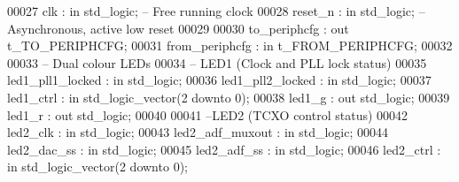 \begin{DoxyCode}
00027       \textcolor{vhdlchar}{clk}                  \textcolor{vhdlchar}{:} \textcolor{keywordflow}{in}     \textcolor{comment}{std\_logic};\textcolor{keyword}{ -- Free running clock}
00028       \textcolor{vhdlchar}{reset_n}              \textcolor{vhdlchar}{:} \textcolor{keywordflow}{in}     \textcolor{comment}{std\_logic};\textcolor{keyword}{ -- Asynchronous, active low reset}
00029       
00030       \textcolor{vhdlchar}{to_periphcfg}         \textcolor{vhdlchar}{:} \textcolor{keywordflow}{out}    \textcolor{vhdlchar}{t_TO_PERIPHCFG};
00031       \textcolor{vhdlchar}{from_periphcfg}       \textcolor{vhdlchar}{:} \textcolor{keywordflow}{in}     \textcolor{vhdlchar}{t_FROM_PERIPHCFG};
00032       
00033 \textcolor{keyword}{      -- Dual colour LEDs}
00034 \textcolor{keyword}{      -- LED1 (Clock and PLL lock status)}
00035       \textcolor{vhdlchar}{led1_pll1_locked}     \textcolor{vhdlchar}{:} \textcolor{keywordflow}{in}     \textcolor{comment}{std\_logic};
00036       \textcolor{vhdlchar}{led1_pll2_locked}     \textcolor{vhdlchar}{:} \textcolor{keywordflow}{in}     \textcolor{comment}{std\_logic};
00037       \textcolor{vhdlchar}{led1_ctrl}            \textcolor{vhdlchar}{:} \textcolor{keywordflow}{in}     \textcolor{comment}{std\_logic\_vector}\textcolor{vhdlchar}{(}\textcolor{vhdllogic}{}\textcolor{vhdllogic}{2} \textcolor{keywordflow}{downto} \textcolor{vhdllogic}{}\textcolor{vhdllogic}{0}\textcolor{vhdlchar}{)};
00038       \textcolor{vhdlchar}{led1_g}               \textcolor{vhdlchar}{:} \textcolor{keywordflow}{out}    \textcolor{comment}{std\_logic};
00039       \textcolor{vhdlchar}{led1_r}               \textcolor{vhdlchar}{:} \textcolor{keywordflow}{out}    \textcolor{comment}{std\_logic};
00040       
00041 \textcolor{keyword}{      --LED2 (TCXO control status)}
00042       \textcolor{vhdlchar}{led2_clk}             \textcolor{vhdlchar}{:} \textcolor{keywordflow}{in}     \textcolor{comment}{std\_logic};
00043       \textcolor{vhdlchar}{led2_adf_muxout}      \textcolor{vhdlchar}{:} \textcolor{keywordflow}{in}     \textcolor{comment}{std\_logic};
00044       \textcolor{vhdlchar}{led2_dac_ss}          \textcolor{vhdlchar}{:} \textcolor{keywordflow}{in}     \textcolor{comment}{std\_logic};
00045       \textcolor{vhdlchar}{led2_adf_ss}          \textcolor{vhdlchar}{:} \textcolor{keywordflow}{in}     \textcolor{comment}{std\_logic};
00046       \textcolor{vhdlchar}{led2_ctrl}            \textcolor{vhdlchar}{:} \textcolor{keywordflow}{in}     \textcolor{comment}{std\_logic\_vector}\textcolor{vhdlchar}{(}\textcolor{vhdllogic}{}\textcolor{vhdllogic}{2} \textcolor{keywordflow}{downto} \textcolor{vhdllogic}{}\textcolor{vhdllogic}{0}\textcolor{vhdlchar}{)};

\end{DoxyCode}

